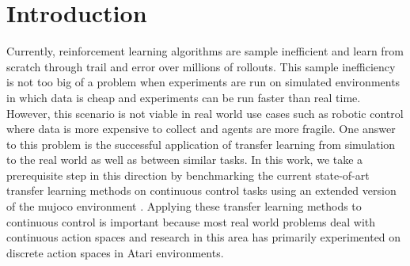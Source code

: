 \section{Introduction}
Currently, reinforcement learning algorithms are sample inefficient and
learn from scratch through trail and error over millions of rollouts.
This sample inefficiency is not too big of a problem when experiments
are run on simulated environments in which data is cheap and experiments
can be run faster than real time. However, this scenario is not viable
in real world use cases such as robotic control where data is more
expensive to collect and agents are more fragile. One answer to this problem
is the successful application of transfer learning from simulation to the real world
as well as between similar tasks. In this work, we take a prerequisite step in this
direction by benchmarking the current state-of-art transfer learning methods
on continuous control tasks using an extended version of the mujoco environment
\cite{four}. Applying these transfer learning methods to continuous control is
important because most real world problems deal with continuous action
spaces and research in this area has primarily experimented on discrete action spaces
in Atari environments.
